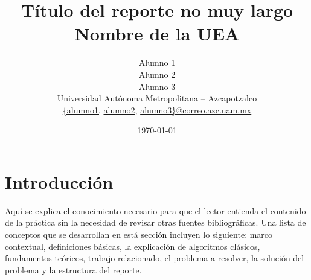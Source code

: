 \documentclass[11pt, twocolumn]{article}
\title{
   \textcolor{Xoc}{{\textbf Título del reporte no muy largo}}\\ %
   \textcolor{Wolf}{\large Nombre de la UEA} %
}
\author{Alumno 1\\ %
        Alumno 2\\
        Alumno 3\\
        Universidad Autónoma Metropolitana -- Azcapotzalco\\  %
        \href{mailto:alumno1@azc.uam.mx}{\{alumno1,}
        \href{mailto:alumno2@azc.uam.mx}{alumno2,}
        \href{mailto:alumno3@azc.uam.mx}{alumno3\}@correo.azc.uam.mx}
}
\date{\today} %
\begin{document}


\section{Introducción}

Aquí se explica el conocimiento necesario para que el lector entienda el contenido de la práctica sin la necesidad de revisar otras fuentes bibliográficas. Una lista de conceptos que se desarrollan en está sección incluyen lo siguiente: marco contextual, definiciones básicas, la explicación de algoritmos clásicos, fundamentos teóricos, trabajo relacionado, el problema a resolver, la solución del problema y la estructura del reporte.
\end{document}
